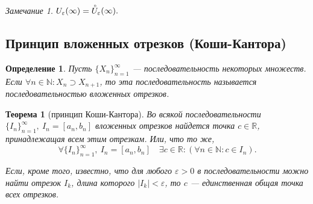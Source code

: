 \documentclass[a4paper,12pt]{article} %
\newtheorem{definition}{Определение}[section]
\newtheorem{theorem}{Теорема}[section]
\theoremstyle{remark}
\newtheorem{remark}{Замечание}[theorem]
\theoremstyle{definition}
\begin{document}
\begin{remark}
$U_\varepsilon(\infty)=\accentset{\circ}{U}_\varepsilon(\infty).$
\end{remark}

\subsection{Принцип вложенных отрезков (Коши-Кантора)}
\begin{definition}
	Пусть $\{X_n\}_{n=1}^{\infty}$ --- последовательность некоторых множеств. Если $\forall n\in \mathbb{N}:X_n\supset X_{n+1}$, то эта последовательность называется последовательностью вложенных отрезков.
\end{definition}
\begin{theorem}[принцип Коши-Кантора]
	Во всякой последовательности $\{I_n\}_{n=1}^{\infty}, \ I_n = [a_n, b_n]$ вложенных отрезков найдется точка $c \in \mathbb{R}$, принадлежащая всем этим отрезкам. Или, что то же,
	\[
	\forall \{I_n\}_{n=1}^{\infty}, \ I_n = [a_n, b_n] \quad \exists c\in \mathbb{R} : (\forall n\in \mathbb{N} : c \in I_n)
	.\] 

	Если, кроме того, известно, что для любого $\varepsilon > 0$ в последовательности можно найти отрезок $I_k$, длина которого $|I_k| < \varepsilon$, то $c$ --- единственная общая точка всех отрезков.
\end{theorem}
\end{document}
